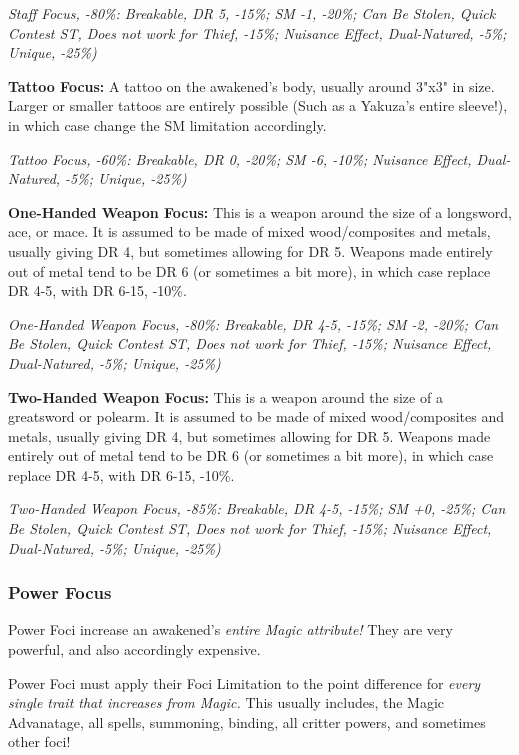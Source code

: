 \begin{multicols*}{2}
	\textcolor{OliveGreen}{\textit{Staff Focus, -80\%: Breakable, DR 5, -15\%; SM -1, -20\%; Can Be Stolen, Quick Contest ST, Does not work for Thief, -15\%; Nuisance Effect, Dual-Natured, -5\%; Unique, -25\%)}}
	
	\textbf{Tattoo Focus:} A tattoo on the awakened's body, usually around 3"x3" in size. Larger or smaller tattoos are entirely possible (Such as a Yakuza's entire sleeve!), in which case change the SM limitation accordingly.
	
	\textcolor{OliveGreen}{\textit{Tattoo Focus, -60\%: Breakable, DR 0, -20\%; SM -6, -10\%; Nuisance Effect, Dual-Natured, -5\%; Unique, -25\%)}}
	
	\textbf{One-Handed Weapon Focus:} This is a weapon around the size of a longsword, ace, or mace. It is assumed to be made of mixed wood/composites and metals, usually giving DR 4, but sometimes allowing for DR 5. Weapons made entirely out of metal tend to be DR 6 (or sometimes a bit more), in which case replace DR 4-5, with DR 6-15, -10\%.
	
	\textcolor{OliveGreen}{\textit{One-Handed Weapon Focus, -80\%: Breakable, DR 4-5, -15\%; SM -2, -20\%; Can Be Stolen, Quick Contest ST, Does not work for Thief, -15\%; Nuisance Effect, Dual-Natured, -5\%; Unique, -25\%)}}
	
	\textbf{Two-Handed Weapon Focus:} This is a weapon around the size of a greatsword or polearm. It is assumed to be made of mixed wood/composites and metals, usually giving DR 4, but sometimes allowing for DR 5. Weapons made entirely out of metal tend to be DR 6 (or sometimes a bit more), in which case replace DR 4-5, with DR 6-15, -10\%.
	
	\textcolor{OliveGreen}{\textit{Two-Handed Weapon Focus, -85\%: Breakable, DR 4-5, -15\%; SM +0, -25\%; Can Be Stolen, Quick Contest ST, Does not work for Thief, -15\%; Nuisance Effect, Dual-Natured, -5\%; Unique, -25\%)}}
	
	\subsubsection{Power Focus} Power Foci increase an awakened's \textit{entire Magic attribute!} They are very powerful, and also accordingly expensive.
	
	Power Foci must apply their Foci Limitation to the point difference for \textit{every single trait that increases from Magic.} This usually includes, the Magic Advanatage, all spells, summoning, binding, all critter powers, and sometimes other foci!
	

\end{multicols*}

